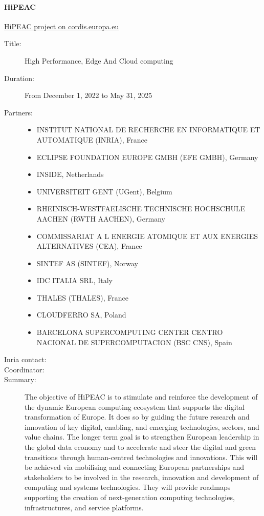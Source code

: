 \paragraph{HiPEAC}




\href{https://dx.doi.org/10.3030/101069836}{HiPEAC project on cordis.europa.eu}
\begin{description}
  \item[Title:] High Performance, Edge And Cloud computing
  \item[Duration:] From December 1, 2022 to May 31, 2025
  \item[Partners:] \leavevmode
  \begin{itemize}
    \item INSTITUT NATIONAL DE RECHERCHE EN INFORMATIQUE ET AUTOMATIQUE (INRIA), France
    \item ECLIPSE FOUNDATION EUROPE GMBH (EFE GMBH), Germany
    \item INSIDE, Netherlands
    \item UNIVERSITEIT GENT (UGent), Belgium
    \item RHEINISCH-WESTFAELISCHE TECHNISCHE HOCHSCHULE AACHEN (RWTH AACHEN), Germany
    \item COMMISSARIAT A L ENERGIE ATOMIQUE ET AUX ENERGIES ALTERNATIVES (CEA), France
    \item SINTEF AS (SINTEF), Norway
    \item IDC ITALIA SRL, Italy
    \item THALES (THALES), France
    \item CLOUDFERRO SA, Poland
    \item BARCELONA SUPERCOMPUTING CENTER CENTRO NACIONAL DE SUPERCOMPUTACION (BSC CNS), Spain
   \end{itemize}
   \item[Inria contact:] 
  \item[Coordinator:] %
  \item[Summary:] The objective of HiPEAC is to stimulate and reinforce the development of the dynamic European computing ecosystem that supports the digital transformation of Europe. It does so by guiding the future research and innovation of key digital, enabling, and emerging technologies, sectors, and value chains.  The longer term goal is to strengthen European leadership in the global data economy and to accelerate and steer the digital and green transitions through human-centred technologies and innovations. This will be achieved via mobilising and connecting European partnerships and stakeholders to be involved in the research, innovation and development of computing and systems technologies. They will provide roadmaps supporting the creation of next-generation computing technologies, infrastructures, and service platforms.




\end{description}
